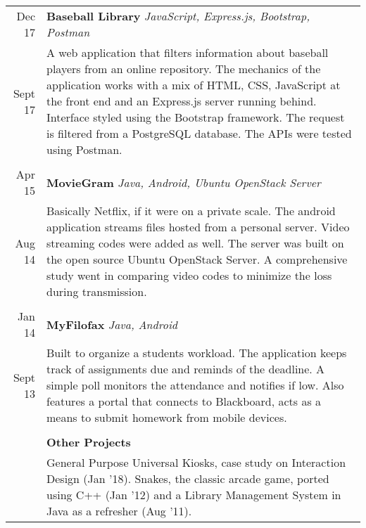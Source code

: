 \documentclass[a4paper,10pt]{article}
\begin{document}
\begin{tabular}{r|p{16cm}}
Dec \textquotesingle{}17 & {\textbf{Baseball Library}} {\sl JavaScript, Express.js, Bootstrap, Postman}\\
Sept \textquotesingle{}17 & \footnotesize{A web application that filters information about baseball players from an online repository. The mechanics of the application works with a mix of HTML, CSS, JavaScript at the front end and an Express.js server running behind. Interface styled using the Bootstrap framework. The request is filtered from a PostgreSQL database. The API\textquotesingle{}s were tested using Postman.}\\ \multicolumn{2}{c}{}\\

Apr \textquotesingle{}15 & {\textbf{MovieGram}} {\sl Java, Android, Ubuntu OpenStack Server}\\
Aug \textquotesingle{}14 & \footnotesize{Basically Netflix, if it were on a private scale. The android application streams files hosted from a personal server. Video streaming codes were added as well. The server was built on the open source Ubuntu OpenStack Server. A comprehensive study went in comparing video codes to minimize the loss during transmission.}\\\multicolumn{2}{c}{}\\

Jan \textquotesingle{}14 & {\textbf{MyFilofax}} {\sl Java, Android}\\
Sept \textquotesingle{}13 & \footnotesize{Built to organize a student\textquotesingle{}s workload. The application keeps track of assignments due and reminds of the deadline. A simple poll monitors the attendance and notifies if low. Also features a portal that connects to Blackboard, acts as a means to submit homework from mobile devices.}\\\multicolumn{2}{c}{}\\

&{\textbf{Other Projects}}\\
&\footnotesize{General Purpose Universal Kiosks, case study on Interaction Design (Jan '18). Snakes, the classic arcade game, ported using C++ (Jan '12) and a Library Management System in Java as a refresher (Aug '11).}\\%
      

\end{tabular}
\end{document}
